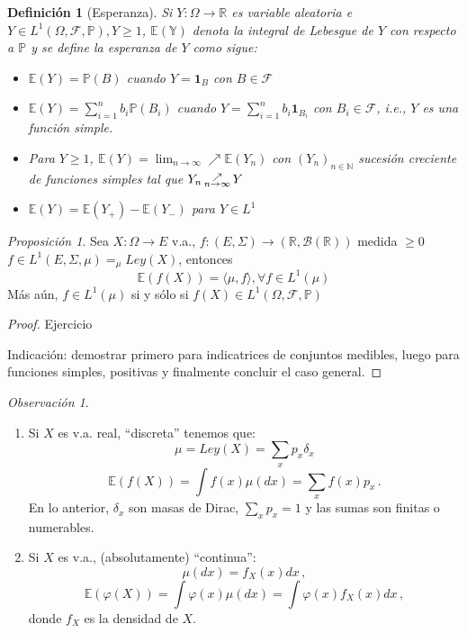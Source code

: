 \documentclass[letterpaper,11pt]{article} %
\def\espacio{\hspace{.25cm}\,}
\theoremstyle{defbreak}
\newtheorem{definition}{Definición}[subsection]
\theoremstyle{propbreak}
\theoremstyle{remark}
\newtheorem{remark}{Observación}[subsection]
\theoremstyle{break}
\newtheorem{proposition}{Proposición}[subsection]
\def\nearrown{\,\substack{\nearrow \\ \tiny{n\to\infty}}\,}
\def\ejercicio{\color{blue}Ejercicio\color{black}}
\def\beforeitemize{\leavevmode \vspace{-0.5\baselineskip}}
\def\negro{\color{black}}
\def\rojo{\color{red}}
\begin{document}
\begin{definition}[Esperanza]
Si $Y:\Omega \longrightarrow \mathbb{R}$ es variable aleatoria e $Y\in L^1(\Omega,\mathcal{F},\mathbb{P}), Y\geq1$, $\mathbb{E(Y)}$ denota la integral de Lebesgue de $Y$ con respecto a $\mathbb{P}$ y se define la esperanza de $Y$ como sigue:

\begin{itemize}
    \item $\mathbb{E}(Y)=\mathbb{P}(B)$ cuando $Y=\mathbf{1}_B$ con $B \in \mathcal{F}$
    \item $\displaystyle\mathbb{E}(Y)=\sum^n_{i=1} b_i \mathbb{P}(B_i)$ cuando $\displaystyle Y=\sum^n_{i=1}b_i\mathbf{1}_{B_i}$ con $B_i \in \mathcal{F}$, i.e., $Y$ es una función simple.
    \item Para $Y\geq1$, $\mathbb{E}(Y) = \displaystyle \lim_{n\rightarrow \infty} \nearrow \mathbb{E}(Y_n)$ con $(Y_n)_{n \in \mathbb{N}}$ sucesión creciente de funciones simples tal que $Y_n \displaystyle \nearrown Y$  %
    \item $\mathbb{E}(Y) = \mathbb{E}(Y_+)-\mathbb{E}(Y_-)$ para $Y\in L^1$
\end{itemize}
\end{definition}

\begin{proposition}
Sea $X:\Omega \longrightarrow E $ v.a., $f:(E,\Sigma)\longrightarrow (\mathbb{R},\mathcal{B(\mathbb{R})})$ medida $\geq 0$ $f\in L^1(E,\Sigma,\mu) =_\mu Ley(X)$, entonces
$$ \mathbb{E}(f(X)) = \langle \mu,f \rangle, \forall f \in L^1(\mu)$$
Más aún, $f\in L^1(\mu)$ si y sólo si $f(X) \in L^1(\Omega,\mathcal{F},\mathbb{P})$
\end{proposition}
\begin{proof}
\ejercicio

Indicación: demostrar primero para indicatrices de conjuntos medibles, luego para funciones simples, positivas y finalmente concluir el caso general. 
\end{proof}

\begin{remark}
\beforeitemize
\begin{enumerate}
    \item Si $X$ es v.a. real, ``discreta'' tenemos que:
    $$ \mu=Ley(X) = \sum_x p_x\delta_x$$
    $$\mathbb{E}(f(X)) = \int f(x)\mu(dx) = \sum_x f(x)p_x \, .$$
    En lo anterior, $\delta_x$ son masas de Dirac, $\sum_xp_x = 1$ y las sumas son finitas o numerables.
    \item Si $X$ es v.a., (absolutamente) ``continua'':
    $$ \mu(dx) = f_X(x)dx \, ,$$ 
    $$ \mathbb{E}(\varphi(X))=\int \varphi(x)\mu(dx)=\int\varphi(x) f_X(x)dx \, ,$$
    donde $f_X$ es la densidad de $X$.
\end{enumerate}
\end{remark}
\end{document}
